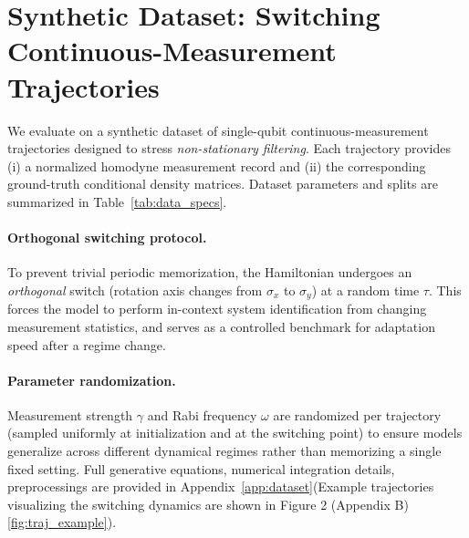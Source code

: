 \documentclass{article} %
\begin{document}
\section{Synthetic Dataset: Switching Continuous-Measurement Trajectories}
\label{sec:dataset}
We evaluate on a synthetic dataset of single-qubit continuous-measurement trajectories designed to stress \emph{non-stationary filtering}\cite{breuer2002open}.
Each trajectory provides (i) a normalized homodyne measurement record and (ii) the corresponding ground-truth conditional density matrices.
Dataset parameters and splits are summarized in Table~\ref{tab:data_specs}.

\paragraph{Orthogonal switching protocol.}
To prevent trivial periodic memorization, the Hamiltonian undergoes an \emph{orthogonal} switch (rotation axis changes from $\sigma_x$ to $\sigma_y$) at a random time $\tau$.
This forces the model to perform in-context system identification from changing measurement statistics, and serves as a controlled benchmark for adaptation speed after a regime change.

\paragraph{Parameter randomization.}
Measurement strength $\gamma$ and Rabi frequency $\omega$ are randomized per trajectory (sampled uniformly at initialization and at the switching point) to ensure models generalize across different dynamical regimes rather than memorizing a single fixed setting.
Full generative equations, numerical integration details, preprocessings are provided in Appendix~\ref{app:dataset}(Example trajectories visualizing the switching dynamics are shown in Figure 2 (Appendix B) \ref{fig:traj_example}).
\end{document}
